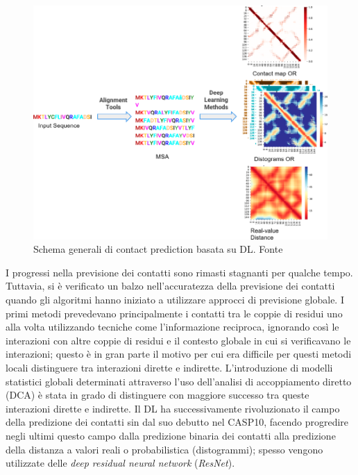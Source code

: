 \begin{figure}[!htb]
	\centering
	\includegraphics[scale=0.6]{images/FM-template.png}
	\caption{Schema generali di contact prediction basata su DL. Fonte\cite{pakhrin2021deep}}
	\label{fig:fm-template-dl}
\end{figure}

\par I progressi nella previsione dei contatti sono rimasti stagnanti per qualche tempo. Tuttavia, si è verificato un balzo nell'accuratezza della previsione dei contatti quando gli algoritmi hanno iniziato a utilizzare approcci di previsione globale. I primi metodi prevedevano principalmente i contatti tra le coppie di residui uno alla volta utilizzando tecniche come l'informazione reciproca, ignorando così le interazioni con altre coppie di residui e il contesto globale in cui si verificavano le interazioni; questo è in gran parte il motivo per cui era difficile per questi metodi locali distinguere tra interazioni dirette e indirette. L'introduzione di modelli statistici globali determinati attraverso l'uso dell'analisi di accoppiamento diretto (DCA) è stata in grado di distinguere con maggiore successo tra queste interazioni dirette e indirette. Il DL ha successivamente rivoluzionato il campo della predizione dei contatti sin dal suo debutto nel CASP10, facendo progredire negli ultimi questo campo dalla predizione binaria dei contatti alla predizione della distanza a valori reali o probabilistica (distogrammi); spesso vengono utilizzate delle \textit{deep residual neural network} (\textit{ResNet}).  

